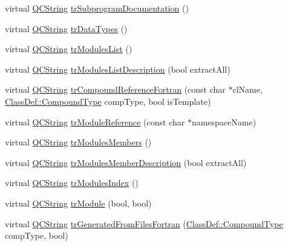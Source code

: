 \begin{DoxyCompactItemize}
\item 
virtual \mbox{\hyperlink{class_q_c_string}{Q\+C\+String}} \mbox{\hyperlink{class_translator_japanese_afe1749201f814a91249daed400e03888}{tr\+Subprogram\+Documentation}} ()
\item 
virtual \mbox{\hyperlink{class_q_c_string}{Q\+C\+String}} \mbox{\hyperlink{class_translator_japanese_a45062c61a35ca4f9dab8f943c9a26c13}{tr\+Data\+Types}} ()
\item 
virtual \mbox{\hyperlink{class_q_c_string}{Q\+C\+String}} \mbox{\hyperlink{class_translator_japanese_a968f9e75902ec573a9bca1d3507317af}{tr\+Modules\+List}} ()
\item 
virtual \mbox{\hyperlink{class_q_c_string}{Q\+C\+String}} \mbox{\hyperlink{class_translator_japanese_a0d87a4f031ff4b5554c52b998f7f6d1e}{tr\+Modules\+List\+Description}} (bool extract\+All)
\item 
virtual \mbox{\hyperlink{class_q_c_string}{Q\+C\+String}} \mbox{\hyperlink{class_translator_japanese_aadf32871adeb9fca4be7d646fb789f24}{tr\+Compound\+Reference\+Fortran}} (const char $\ast$cl\+Name, \mbox{\hyperlink{class_class_def_ae70cf86d35fe954a94c566fbcfc87939}{Class\+Def\+::\+Compound\+Type}} comp\+Type, bool is\+Template)
\item 
virtual \mbox{\hyperlink{class_q_c_string}{Q\+C\+String}} \mbox{\hyperlink{class_translator_japanese_ae35118a010e47e6b72e583c8339e61ec}{tr\+Module\+Reference}} (const char $\ast$namespace\+Name)
\item 
virtual \mbox{\hyperlink{class_q_c_string}{Q\+C\+String}} \mbox{\hyperlink{class_translator_japanese_a4175582f2eac50a965e39f1cfca2b125}{tr\+Modules\+Members}} ()
\item 
virtual \mbox{\hyperlink{class_q_c_string}{Q\+C\+String}} \mbox{\hyperlink{class_translator_japanese_ae7648c8c570d99fa6e60725385716b74}{tr\+Modules\+Member\+Description}} (bool extract\+All)
\item 
virtual \mbox{\hyperlink{class_q_c_string}{Q\+C\+String}} \mbox{\hyperlink{class_translator_japanese_a246e8cf46ee7e2af07831b55cf5b9608}{tr\+Modules\+Index}} ()
\item 
virtual \mbox{\hyperlink{class_q_c_string}{Q\+C\+String}} \mbox{\hyperlink{class_translator_japanese_a357fb0ca2586478cf1f0d1ce81fa78a1}{tr\+Module}} (bool, bool)
\item 
virtual \mbox{\hyperlink{class_q_c_string}{Q\+C\+String}} \mbox{\hyperlink{class_translator_japanese_a21b41a1dce30b8cbca15050d62ba62b2}{tr\+Generated\+From\+Files\+Fortran}} (\mbox{\hyperlink{class_class_def_ae70cf86d35fe954a94c566fbcfc87939}{Class\+Def\+::\+Compound\+Type}} comp\+Type, bool)

\end{DoxyCompactItemize}
